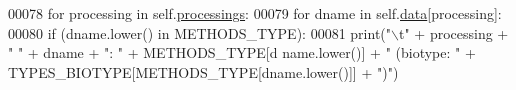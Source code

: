 \begin{DoxyCode}
00078         \textcolor{keywordflow}{for} processing \textcolor{keywordflow}{in} self.\hyperlink{classnavicom_1_1navicom_1_1NaviCom_a5a255d56e997ddcc653d8f06c741ea13}{processings}:
00079             \textcolor{keywordflow}{for} dname \textcolor{keywordflow}{in} self.\hyperlink{classnavicom_1_1navicom_1_1NaviCom_aa1abff245573ed8406c6bddb4596f093}{data}[processing]:
00080                 \textcolor{keywordflow}{if} (dname.lower() \textcolor{keywordflow}{in} METHODS\_TYPE):
00081                     \textcolor{keywordflow}{print}(\textcolor{stringliteral}{"\(\backslash\)t"} + processing + \textcolor{stringliteral}{" "} + dname + \textcolor{stringliteral}{": "} + METHODS\_TYPE[d
      name.lower()] + \textcolor{stringliteral}{" (biotype: "} + TYPES\_BIOTYPE[METHODS\_TYPE[dname.lower()]] + \textcolor{stringliteral}{")"})
      

\end{DoxyCode}
